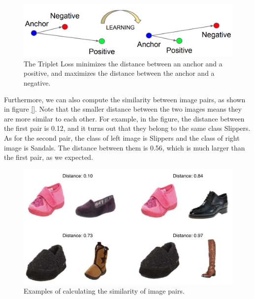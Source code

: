 \begin{figure}[h]
  \centering
  \includegraphics[width=\linewidth]{figs/tripletloss.png}
  \caption{The Triplet Loss minimizes the distance between an anchor and a positive, and maximizes the distance between the anchor and a negative.}
  \label{fig:tripletloss}
\end{figure}


Furthermore, we can also compute the similarity between image pairs, as shown in figure \ref{}. Note that the smaller distance between the two images means they are more similar to each other. For example, in the figure, the distance between the first pair is 0.12, and it turns out that they belong to the same class Slippers. As for the second pair, the class of left image is Slippers and the class of right image is Sandals. The distance between them is 0.56, which is much larger than the first pair, as we expected. 

\begin{figure}[h]
  \centering
  \includegraphics[width=\linewidth]{figs/similarity.png}
  \caption{Examples of calculating the similarity of image pairs.}
  \label{fig:similarity}
\end{figure}


